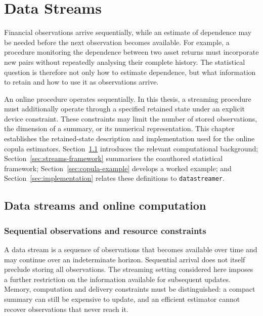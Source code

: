 \chapter{Data Streams}

Financial observations arrive sequentially, while an estimate of dependence may be needed before the next observation becomes available. For example, a procedure monitoring the dependence between two asset returns must incorporate new pairs without repeatedly analysing their complete history. The statistical question is therefore not only how to estimate dependence, but what information to retain and how to use it as observations arrive.

An online procedure operates sequentially. In this thesis, a streaming procedure must additionally operate through a specified retained state under an explicit device constraint. These constraints may limit the number of stored observations, the dimension of a summary, or its numerical representation. This chapter establishes the retained-state description and implementation used for the online copula estimators. Section~\ref{sec:background} introduces the relevant computational background; Section~\ref{sec:streams-framework} summarises the coauthored statistical framework; Section~\ref{sec:copula-example} develops a worked example; and Section~\ref{sec:implementation} relates these definitions to \texttt{datastreamer}.

\section{Data streams and online computation}
\label{sec:background}

\subsection{Sequential observations and resource constraints}
A data stream is a sequence of observations that becomes available over time and may continue over an indeterminate horizon. Sequential arrival does not itself preclude storing all observations. The streaming setting considered here imposes a further restriction on the information available for subsequent updates. Memory, computation and delivery constraints must be distinguished: a compact summary can still be expensive to update, and an efficient estimator cannot recover observations that never reach it.

